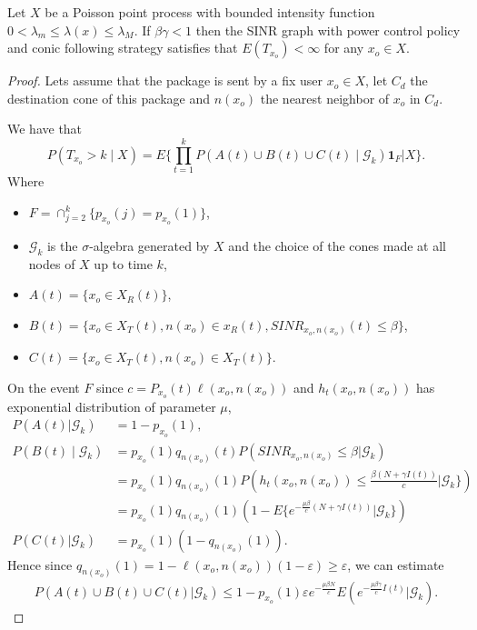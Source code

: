 \begin{thm}\label{teo4.1} Let $X$ be a Poisson point process with bounded intensity function $0<\lambda_m\leq\lambda(x)\leq\lambda_M$. If $\beta\gamma<1$ then the SINR graph with power control policy and conic following strategy satisfies that $E(T_{x_o})<\infty$ for any $x_o\in X$.
\end{thm}
\begin{proof}

Lets assume that the package is sent by a fix user $x_o\in X$, let $C_d$ the destination cone of this package and $n(x_o)$ the nearest neighbor of $x_o$ in $C_d$.

We have that 
$$P(T_{x_o}>k\mid X)=E\lbrace\prod_{t=1}^k P(A(t)\cup B(t)\cup C(t)\mid \mathcal{G}_k)\textbf{1}_F\vert X \rbrace.$$
Where
\begin{itemize}
\item$F=\cap_{j=2}^{k}\lbrace p_{x_o}(j)=p_{x_o}(1)\rbrace$,
\item$\mathcal{G}_{k}$ is the $\sigma$-algebra generated by $X$ and the choice of the cones made at all nodes of $X$ up to time $k$,
\item$A(t)=\lbrace x_o\in X_R(t)\rbrace$,
\item$B(t)=\lbrace x_o\in X_T(t), n(x_o)\in x_R(t), SINR_{x_o, n(x_o)}(t)\leq\beta\rbrace$,
\item$C(t)=\lbrace x_o\in X_T(t), n(x_o)\in X_T(t)\rbrace$.
\end{itemize}


On the event $F$ since $c=P_{x_o}(t)\ell(x_o,n(x_o))$ and $h_t(x_o,n(x_o))$ has exponential distribution of parameter $\mu$,
\begin{align*}
P(A(t)\vert\mathcal{G}_k)&=1-p_{x_o}(1),\\
P(B(t)\mid\mathcal{G}_k)&=p_{x_o}(1)q_{n(x_o)}(t)P(SINR_{x_o,n (x_o)}\leq \beta\vert \mathcal{G}_k)\\
&=p_{x_o}(1)q_{n(x_o)}(1)P(h_t(x_o,n(x_o))\leq\frac{\beta(N+\gamma I(t))}{c}\vert\mathcal{G}_k\rbrace)\\
&=p_{x_o}(1)q_{n(x_o)}(1)(1-E\lbrace e^{-\frac{\mu\beta}{c}(N+\gamma I(t))}\vert\mathcal{G}_k\rbrace)\\
P(C(t)\vert\mathcal{G}_k)&=p_{x_o}(1)(1-q_{n(x_o)}(1)).
\end{align*}
Hence since $ q_{n(x_o)}(1)=1-\ell(x_o, n(x_o))(1-\varepsilon)\geq \varepsilon$, we can estimate
\begin{align}
P(A(t)\cup B(t)\cup C(t)\vert\mathcal{G}_k)\leq 1-p_{x_o}(1)\varepsilon e^{-\frac{\mu\beta N}{c}}E(e^{-\frac{\mu\beta \gamma}{c}I(t)}\vert\mathcal{G}_k). \label{eq:1}
\end{align}


\end{proof}
